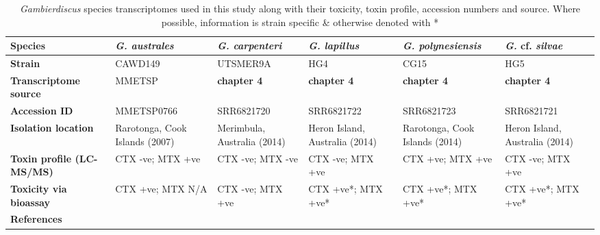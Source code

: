 \documentclass[12pt]{article}
\begin{document}
\FloatBarrier
\begin{table}
\caption{\emph{Gambierdiscus} species transcriptomes used in this study along with their toxicity, toxin profile, accession numbers and source. Where possible, information is strain specific \& otherwise denoted with *}
\label{tbl:StrainTable}
\begin{tabular}{ | p{2.5cm} | p{2.3cm} | p{2.3cm} | p{2.3cm} | p{2.3cm} | p{2.3cm}|}
\hline
\textbf{Species}&\textit{G. australes}&\textit{G. carpenteri}&\textit{G. lapillus}&\textit{G. polynesiensis}&\textit{G.} cf. \textit{silvae}\\
\hline
\textbf{Strain}&CAWD149&UTSMER9A&HG4&CG15&HG5\\
\hline
\textbf{Transcriptome source}&MMETSP&\textbf{chapter 4}&\textbf{chapter 4}&\textbf{chapter 4}&\textbf{chapter 4}\\
\hline
\textbf{Accession ID}&MMETSP0766&SRR6821720&SRR6821722&SRR6821723&SRR6821721\\
\hline
\textbf{Isolation location}&Rarotonga, Cook Islands (2007)&Merimbula, Australia (2014)&Heron Island, Australia (2014)&Rarotonga, Cook Islands (2014)&Heron Island, Australia (2014)\\
\hline
\textbf{Toxin profile (LC-MS/MS)}&CTX -ve; MTX +ve&CTX -ve; MTX -ve&CTX -ve; MTX +ve&CTX +ve; MTX +ve&CTX -ve; MTX +ve\\
\hline
\textbf{Toxicity via bioassay}&CTX +ve; MTX N/A&CTX -ve; MTX +ve&CTX +ve*; MTX +ve*&CTX +ve*; MTX +ve*&CTX +ve*; MTX +ve*\\
\hline
\textbf{References}&\cite{keeling2014marine,rhodes2010toxic,munday2017ciguatoxins}&\cite{larsson2018toxicology}&\cite{larsson2018toxicology,kretzschmar2017characterization}&&\cite{larsson2018toxicology,kretzschmar2017characterization}\\
\hline
\end{tabular}
\end{table}
\FloatBarrier

\end{document}
